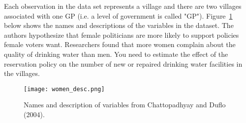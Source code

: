 \documentclass[12pt,letterpaper]{article}
\begin{document}
	Each observation in the data set represents a village and there are two villages associated with one GP (i.e. a level of government is called "GP"). Figure~\ref{fig:women_desc} below shows the names and descriptions of the variables in the dataset. The authors hypothesize that female politicians are more likely to support policies female voters want. Researchers found that more women complain about the quality of drinking water than men. You need to estimate the effect of the reservation policy on the number of new or repaired drinking water facilities in the villages.
	
	\begin{figure}[H]
		\centering
		\texttt{[image: women\_desc.png]}
		\caption{\footnotesize{Names and description of variables from Chattopadhyay and Duflo (2004).}}
		\label{fig:women_desc}
	\end{figure}
	
\end{document}
